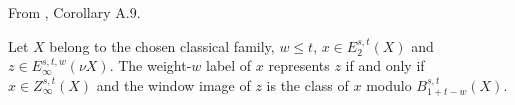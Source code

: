 \begin{theorem}
\label{frontier:Literature:322d0d20f79e}
From \cite{BHS}, Corollary A.9.\par

Let $X$ belong to the chosen classical family, $w\le t$, $x\in E_2^{s,t}(X)$ and $z\in E_\infty^{s,t,w}(\nu X)$. The weight-$w$ label of $x$ represents $z$ if and only if $x\in Z_\infty^{s,t}(X)$ and the window image of $z$ is the class of $x$ modulo $B_{1+t-w}^{s,t}(X)$.
\end{theorem}

